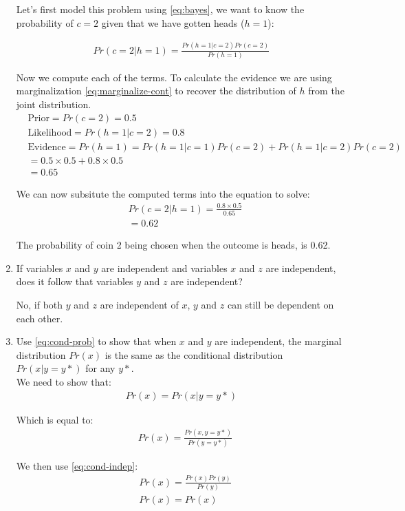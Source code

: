 \documentclass{article}
\begin{document}
\begin{enumerate}
Let's first model this problem using \ref{eq:bayes}, we want to know the probability of $c=2$ given that we have gotten heads ($h=1$):

\begin{align*}
	Pr\left( c=2|h=1 \right) = \frac{Pr\left( h=1|c=2 \right) Pr\left( c=2 \right) }{Pr\left( h=1 \right) }
\end{align*}

Now we compute each of the terms. To calculate the evidence we are using marginalization \ref{eq:marginalize-cont} to recover the distribution of $h$ from the joint distribution.
\begin{align*}
	&\text{Prior}=Pr\left( c=2 \right) = 0.5 \\
	&\text{Likelihood}=Pr\left( h=1|c=2 \right) = 0.8 \\
	&\text{Evidence}=Pr\left( h=1 \right) = Pr(h=1|c=1)Pr(c=2) + Pr\left( h=1|c=2 \right) Pr(c=2)\\
	&= 0.5 \times 0.5 + 0.8 \times 0.5\\
	&= 0.65
\end{align*}


We can now subsitute the computed terms into the equation to solve:
\begin{align*}
	&Pr\left( c=2|h=1 \right) = \frac{0.8 \times 0.5}{0.65} \\
	&=0.62
\end{align*}

The probability of coin 2 being chosen when the outcome is heads, is 0.62.

\item If variables $x$ and $y$ are independent and variables $x$ and $z$ are independent, does it follow that variables $y$ and $z$ are independent?

No, if both $y$ and $z$ are independent of $x$, $y$ and $z$ can still be dependent on each other.

\item Use \ref{eq:cond-prob} to show that when $x$ and $y$ are independent, the marginal distribution $Pr(x)$ is the same as the conditional distribution $Pr(x|y=y*)$ for any $y*$. \\

We need to show that:
\begin{align*}
	Pr\left( x \right) = Pr\left( x|y=y* \right) 
\end{align*}

Which is equal to:
\begin{align*}
	&Pr\left( x \right) = \frac{Pr\left( x,y=y* \right) }{Pr\left( y=y* \right) }
\end{align*}

We then use \ref{eq:cond-indep}:
\begin{align*}
	&Pr\left( x \right) = \frac{Pr\left( x \right) Pr(y)}{Pr\left( y \right) } \\
	&Pr\left( x \right) = Pr\left( x \right) 
\end{align*}

\end{enumerate}
\end{document}
